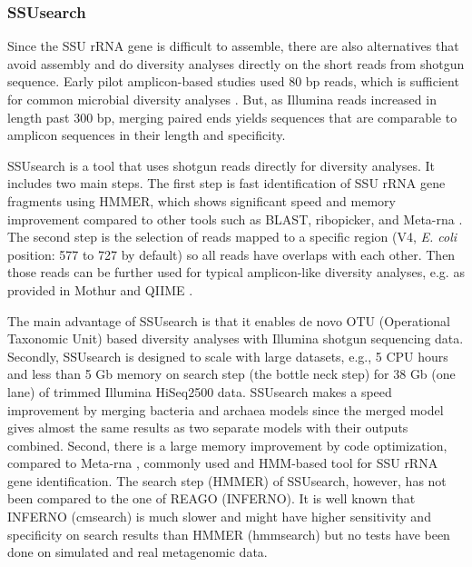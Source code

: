 \documentclass[]{msu-thesis}
\begin{document}
\subsubsection{SSUsearch}
Since the SSU rRNA gene is difficult to assemble, there are also
alternatives that avoid assembly and do diversity analyses directly on
the short reads from shotgun sequence. Early pilot amplicon-based
studies used 80 bp reads, which is sufficient for common microbial
diversity analyses \cite{sogin_microbial_2006}.  But, as Illumina reads
increased in length past 300 bp, merging paired ends yields sequences
that are comparable to amplicon sequences in their length and
specificity.


SSUsearch \cite{guo_microbial_2015} is a tool that uses shotgun reads
directly for diversity analyses. It includes two main steps. The first
step is fast identification of SSU rRNA gene fragments using HMMER,
which shows significant speed and memory improvement compared to other
tools such as BLAST, ribopicker, and Meta-rna
\cite{altschul_gapped_1997,schmieder_identification_2012,huang_identification_2009}.
The second step is the selection of reads mapped to a specific region
(V4, \textit{E. coli} position: 577 to 727 by default) so all reads have
overlaps with each other. Then those reads can be further used for
typical amplicon-like diversity analyses, e.g. as provided in Mothur and
QIIME \cite{schloss_introducing_2009,kuczynski_using_2012}.

The main advantage of SSUsearch is that it enables de novo OTU
(Operational Taxonomic Unit) based diversity analyses with Illumina
shotgun sequencing data. Secondly, SSUsearch is designed to scale with
large datasets, e.g., 5 CPU hours and less than 5 Gb memory on search
step (the bottle neck step) for 38 Gb (one lane) of trimmed Illumina
HiSeq2500 data. SSUsearch makes a speed improvement by merging bacteria
and archaea models since the merged model gives almost the same results
as two separate models with their outputs combined. Second, there is a
large memory improvement by code optimization, compared to Meta-rna
\cite{huang_identification_2009}, commonly used and HMM-based tool for
SSU rRNA gene identification. The search step (HMMER) of SSUsearch,
however, has not been compared to the one of REAGO (INFERNO). It is well
known that INFERNO (cmsearch) is much slower and might have higher
sensitivity and specificity on search results than HMMER (hmmsearch) but
no tests have been done on simulated and real metagenomic data.
\end{document}
